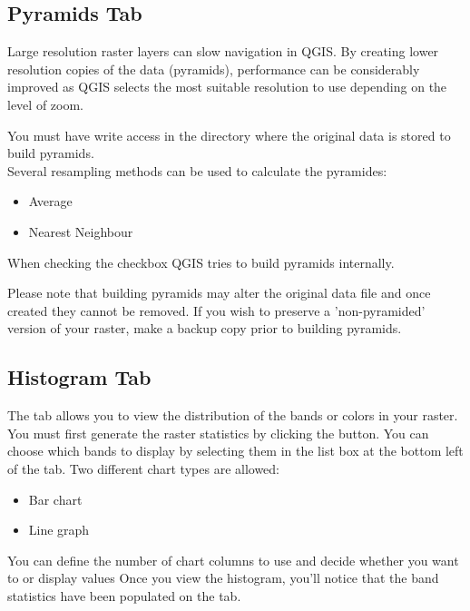 \subsection{Pyramids Tab}\label{raster_pyramids}

Large resolution raster layers can slow navigation in QGIS. By creating lower
resolution copies of the data (pyramids), performance can be considerably
improved as QGIS selects the most suitable resolution to use depending on the
level of zoom.

You must have write access in the directory where the original data is stored
to build pyramids. \\
Several resampling methods can be used to calculate the pyramides:
\begin{itemize}[label=--]
\item Average
\item Nearest Neighbour
\end{itemize}

When checking the checkbox  QGIS tries to build pyramids internally.

Please note that building pyramids may alter the original data file and once
created they cannot be removed. If you wish to preserve a 'non-pyramided'
version of your raster, make a backup copy prior to building pyramids.

\subsection{Histogram Tab}\label{label_histogram}

The  tab allows you to view the distribution
of the bands or colors in your raster. You must first generate the raster statistics
by clicking the  button. You can choose which bands to display by
selecting them in the list box at the bottom left of the tab. Two different
chart types are allowed:

\begin{itemize}[label=--]
\item Bar chart
\item Line graph
\end{itemize}

You can define the number of chart columns to use and decide whether you want
to  or display  values
Once you view the histogram, you'll notice that the band statistics have been
populated on the  tab.

